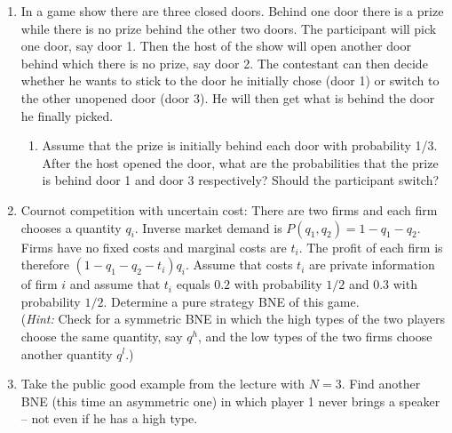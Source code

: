 \documentclass[a4paper,12pt]{article}
\begin{document}
\begin{enumerate}
\item In a game show there are three closed doors. Behind one door there is a prize while there is no prize behind the other two doors. The participant will pick one door, say door 1. Then the host of the show will open another door behind which there is no prize, say door 2. The contestant can then decide whether he wants to stick to the door he initially chose (door 1) or switch to the other unopened door (door 3). He will then get what is behind the door he finally picked.
  \begin{enumerate}
  \item Assume that the prize is initially behind each door with probability 1/3. After the host opened the door, what are the probabilities that the prize is behind door 1 and door 3 respectively? Should the participant switch?
  \end{enumerate}
\item Cournot competition with uncertain cost: There are two firms and each firm chooses a quantity $q_i$. Inverse market demand is $P(q_1,q_2)=1-q_1-q_2$. Firms have no fixed costs and marginal costs are $t_i$. The profit of each firm is therefore $(1-q_1-q_2-t_i)q_i$. Assume that costs $t_i$ are private information of firm $i$ and assume that $t_i$ equals $0.2$ with probability $1/2$ and $0.3$ with probability $1/2$. Determine a pure strategy BNE of this game.\\
  (\emph{Hint: }Check for a symmetric BNE in which the high types of the two players choose the same quantity, say $q^h$, and the low types of the two firms choose another quantity $q^l$.)
\item Take the public good example from the lecture with $N=3$. Find another BNE (this time an asymmetric one) in which player 1 never brings a speaker -- not even if he has a high type.
\end{enumerate}
\end{document}
